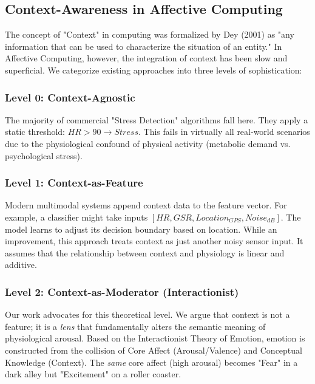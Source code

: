 \documentclass[journal]{IEEEtran}
\begin{document}
\subsection{Context-Awareness in Affective Computing}
The concept of "Context" in computing was formalized by Dey (2001) as "any information that can be used to characterize the situation of an entity." In Affective Computing, however, the integration of context has been slow and superficial.
We categorize existing approaches into three levels of sophistication:
\subsubsection{Level 0: Context-Agnostic}
The majority of commercial "Stress Detection" algorithms fall here. They apply a static threshold: $HR > 90 \to Stress$. This fails in virtually all real-world scenarios due to the physiological confound of physical activity (metabolic demand vs. psychological stress).
\subsubsection{Level 1: Context-as-Feature}
Modern multimodal systems append context data to the feature vector. For example, a classifier might take inputs $[HR, GSR, Location_{GPS}, Noise_{dB}]$. The model learns to adjust its decision boundary based on location.
While an improvement, this approach treats context as just another noisy sensor input. It assumes that the relationship between context and physiology is linear and additive.
\subsubsection{Level 2: Context-as-Moderator (Interactionist)}
Our work advocates for this theoretical level. We argue that context is not a feature; it is a \textit{lens} that fundamentally alters the semantic meaning of physiological arousal.
Based on the Interactionist Theory of Emotion, emotion is constructed from the collision of Core Affect (Arousal/Valence) and Conceptual Knowledge (Context). The \textit{same} core affect (high arousal) becomes "Fear" in a dark alley but "Excitement" on a roller coaster.
\end{document}
